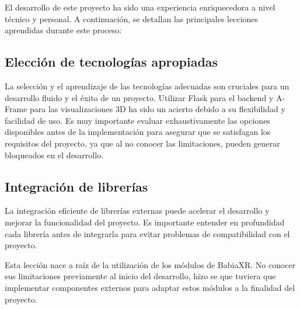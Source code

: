 \documentclass[a4paper, 12pt]{book}
\begin{document}
El desarrollo de este proyecto ha sido una experiencia enriquecedora a nivel técnico y personal. A continuación, se detallan las principales lecciones aprendidas durante este proceso:

\subsection{Elección de tecnologías apropiadas}
La selección y el aprendizaje de las tecnologías adecuadas son cruciales para un desarrollo fluido y el éxito de un proyecto. Utilizar Flask para el backend y A-Frame para las visualizaciones 3D ha sido un acierto debido a su flexibilidad y facilidad de uso. Es muy importante evaluar exhaustivamente las opciones disponibles antes de la implementación para asegurar que se satisfagan los requisitos del proyecto, ya que al no conocer las limitaciones, pueden generar bloqueados en el desarrollo.

\subsection{Integración de librerías}
La integración eficiente de librerías externas puede acelerar el desarrollo y mejorar la funcionalidad del proyecto. Es importante entender en profundidad cada librería antes de integrarla para evitar problemas de compatibilidad con el proyecto.

Esta lección nace a raíz de la utilización de los módulos de BabiaXR. No conocer sus limitaciones previamente al inicio del desarrollo, hizo se que tuviera que implementar componentes externos para adaptar estos módulos a la finalidad del proyecto. 


\end{document}
